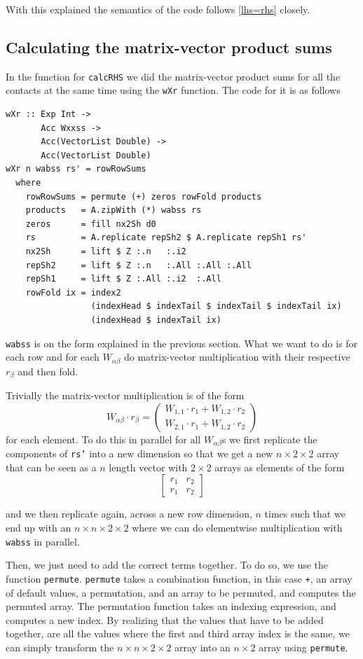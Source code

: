\documentclass[runningheads,a4paper]{llncs}
\begin{document}
With this explained the semantics of the code follows \eqref{lhs=rhs} closely.

\subsection{Calculating the matrix-vector product sums}
In the function for \texttt{calcRHS} we did the matrix-vector product sums
for all the contacts at the same time using the \texttt{wXr} function.
The code for it is as follows
\begin{verbatim}
wXr :: Exp Int ->
       Acc Wxxss ->
       Acc(VectorList Double) ->
       Acc(VectorList Double)
wXr n wabss rs' = rowRowSums
  where
    rowRowSums = permute (+) zeros rowFold products
    products   = A.zipWith (*) wabss rs
    zeros      = fill nx2Sh d0
    rs         = A.replicate repSh2 $ A.replicate repSh1 rs'
    nx2Sh      = lift $ Z :.n   :.i2
    repSh2     = lift $ Z :.n   :.All :.All :.All
    repSh1     = lift $ Z :.All :.i2  :.All
    rowFold ix = index2
                 (indexHead $ indexTail $ indexTail $ indexTail ix)
                 (indexHead $ indexTail ix)
\end{verbatim}

\texttt{wabss} is on the form explained in the previous section.
What we want to do is for each row and for each $W_{\alpha\beta}$
do matrix-vector multiplication with their respective $r_\beta$
and then fold.

Trivially the matrix-vector multiplication is of the form
\[
W_{\alpha\beta} \cdot r_\beta =
\begin{pmatrix}
W_{1,1} \cdot r_{1} + W_{1,2} \cdot r_{2} \\
W_{2,1} \cdot r_{1} + W_{1,2} \cdot r_{2}
\end{pmatrix}
\]
for each element.
To do this in parallel for all $W_{\alpha\beta}$s
we first replicate the components of \texttt{rs'}
into a new dimension so that we get a new $n \times 2 \times 2$
array that can be seen as a $n$ length vector with $2 \times 2$
arrays as elements of the form
\[
\begin{bmatrix}
r_{1} & r_{2} \\
r_{1} & r_{2}
\end{bmatrix}
\]

and we then replicate again, across a new row dimension,
$n$ times such that we end up with an $n \times n \times 2 \times 2$
where we can do elementwise multiplication with \texttt{wabss} in parallel.

Then, we just need to add the correct terms together. To do so, we use the
function \verb+permute+. \verb+permute+ takes a combination function, in this
case \verb-+-, an array of default values, a permutation, and an array to be
permuted, and computes the permuted array. The permutation function takes an
indexing expression, and computes a new index. By realizing that the values
that have to be added together, are all the values where the first and third
array index is the same, we can simply transform the $n \times n \times 2
\times 2$ array into an $n \times 2$ array using \verb+permute+.
\end{document}
